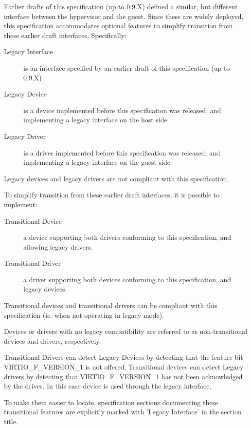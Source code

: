 Earlier drafts of this specification (up to 0.9.X) defined a similar, but
different interface between the hypervisor and the guest.
Since these are widely deployed, this specification
accommodates optional features to simplify transition
from these earlier draft interfaces. Specifically:

\begin{description}
\item[Legacy Interface]
        is an interface specified by an earlier draft of this specification
        (up to 0.9.X)
\item[Legacy Device]
        is a device implemented before this specification was released,
        and implementing a legacy interface on the host side
\item[Legacy Driver]
        is a driver implemented before this specification was released,
        and implementing a legacy interface on the guest side
\end{description}

Legacy devices and legacy drivers are not compliant with this
specification.

To simplify transition from these earlier draft interfaces,
it is possible to implement:

\begin{description}
\item[Transitional Device]
        a device supporting both drivers conforming to this
        specification, and allowing legacy drivers.

\item[Transitional Driver]
        a driver supporting both devices conforming to this
        specification, and legacy devices.
\end{description}

Transitional devices and transitional drivers can be compliant with
this specification (ie. when not operating in legacy mode).

Devices or drivers with no legacy compatibility are referred to as
non-transitional devices and drivers, respectively.

Transitional Drivers can detect Legacy Devices by detecting that
the feature bit VIRTIO_F_VERSION_1 is not offered.
Transitional devices can detect Legacy drivers by detecting that
VIRTIO_F_VERSION_1 has not been acknowledged by the driver.
In this case device is used through the legacy interface.

To make them easier to locate, specification sections documenting
these transitional features are explicitly marked with 'Legacy
Interface' in the section title.

